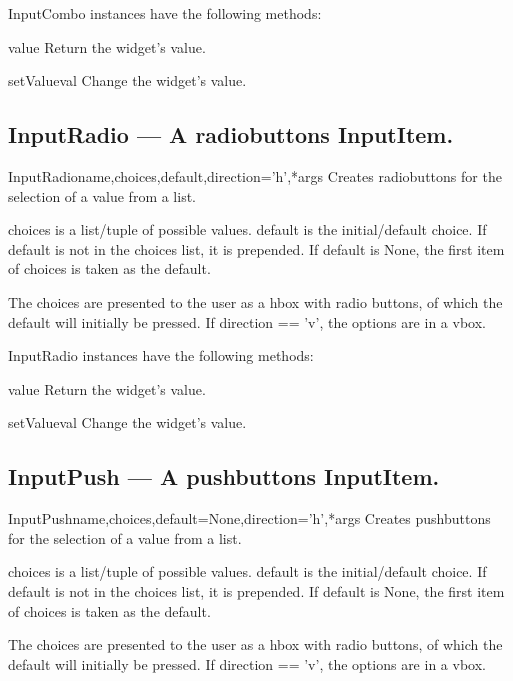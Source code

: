 InputCombo instances have the following methods:

\begin{funcdesc}{value}{}
Return the widget's value.
\end{funcdesc}

\begin{funcdesc}{setValue}{val}
Change the widget's value.
\end{funcdesc}

\subsection{InputRadio --- A radiobuttons InputItem.}


\begin{classdesc}{InputRadio}{name,choices,default,direction='h',*args}
Creates radiobuttons for the selection of a value from a list.

        choices is a list/tuple of possible values.
        default is the initial/default choice.
        If default is not in the choices list, it is prepended.
        If default is None, the first item of choices is taken as the default.
       
        The choices are presented to the user as a hbox with radio buttons,
        of which the default will initially be pressed.
        If direction == 'v', the options are in a vbox. 
        
\end{classdesc}

InputRadio instances have the following methods:

\begin{funcdesc}{value}{}
Return the widget's value.
\end{funcdesc}

\begin{funcdesc}{setValue}{val}
Change the widget's value.
\end{funcdesc}

\subsection{InputPush --- A pushbuttons InputItem.}


\begin{classdesc}{InputPush}{name,choices,default=None,direction='h',*args}
Creates pushbuttons for the selection of a value from a list.

        choices is a list/tuple of possible values.
        default is the initial/default choice.
        If default is not in the choices list, it is prepended.
        If default is None, the first item of choices is taken as the default.
       
        The choices are presented to the user as a hbox with radio buttons,
        of which the default will initially be pressed.
        If direction == 'v', the options are in a vbox. 
        
\end{classdesc}


